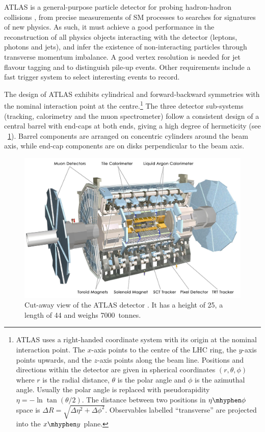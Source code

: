 
ATLAS is a general-purpose particle detector for probing hadron-hadron collisions 
\cite{ATLAS-detector}, from precise measurements of \ac{SM} processes to searches for 
signatures of new physics. As such, it must achieve a good performance in the 
reconstruction of all physics objects interacting with the detector (leptons, photons and 
jets), and infer the existence of non-interacting particles through transverse momentum 
imbalance. A good vertex resolution is needed for jet flavour tagging and to distinguish 
pile-up events. Other requirements include a fast trigger system to select interesting 
events to record.

The design of ATLAS exhibits cylindrical and forward-backward symmetries with the nominal 
interaction point at the centre.\footnote{
	ATLAS uses a right-handed coordinate system with its origin at the nominal 
	interaction point. The $x$-axis points to the centre of the \ac{LHC} ring, the 
	$y$-axis points upwards, and the $z$-axis points along the beam line. Positions and 
	directions within the detector are given in spherical coordinates $(r, \theta, \phi)$ 
	where $r$ is the radial distance, $\theta$ is the polar angle and $\phi$ is the 
	azimuthal angle. Usually the polar angle is replaced with pseudorapidity 
	$\eta = -\ln\tan(\theta/2)$. The distance between two positions in $\eta\mhyphen\phi$ 
	space is $\Delta R = \sqrt{\Delta\eta^2 + \Delta\phi^2}$.
	Observables labelled ``transverse'' are projected into the $x\mhyphen y$ plane.
} 
The three detector sub-systems (tracking, calorimetry and the muon spectrometer) 
follow a consistent design of a central barrel with end-caps at both ends, giving a high 
degree of hermeticity (see \Figure~\ref{fig:atlas_whole}). Barrel components are arranged 
on concentric cylinders around the beam axis, while end-cap components are on disks 
perpendicular to the beam axis.

\begin{figure}
	\includegraphics[width=\hugefigwidth]{tex/experiment/atlas_whole}
	\caption{Cut-away view of the ATLAS detector \cite{ATLAS-detector}. It has a height 
	of \unit{25}{\metre}, a length of \unit{44}{\metre} and weighs 7000~tonnes.}
	\label{fig:atlas_whole}
\end{figure}

